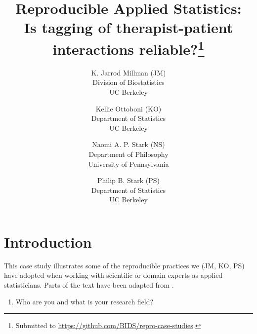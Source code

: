 \documentclass[]{article}
\date{}
\begin{document}
\title{Reproducible Applied Statistics:\\
Is tagging of therapist-patient interactions reliable?\thanks{Submitted
to \url{https://github.com/BIDS/repro-case-studies}.
}}

\author{K. Jarrod Millman (JM)\\ Division of Biostatistics\\ UC Berkeley \and
Kellie Ottoboni (KO)\\ Department of Statistics\\ UC Berkeley \and
Naomi A. P. Stark (NS)\\ Department of Philosophy\\ University of Pennsylvania \and
Philip B. Stark (PS)\\ Department of Statistics\\ UC Berkeley
}


\maketitle


\section{Introduction}

This case study illustrates some of the reproducible practices we (JM, KO, PS)
have adopted when working with scientific or domain experts as applied
statisticians.  Parts of the text have been adapted from
\cite{millman2015thesis}.

\begin{enumerate}
\def\labelenumi{\arabic{enumi})}
\itemsep1pt\parskip0pt
\item
  Who are you and what is your research field?
\end{enumerate}

\end{document}
